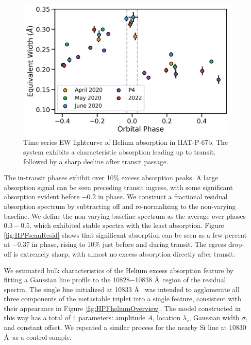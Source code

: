 \documentclass[twocolumn]{aastex631}
\begin{document}
\begin{figure}
    \includegraphics[width=\linewidth]{figures/HAT_P_67b_Helium10830EW_byCampaign.png}
    \caption{Time series EW lightcurve of Helium absorption in HAT-P-67b.  The system exhibits a characteristic absorption leading up to transit, followed by a sharp decline after transit passage.  }
    \label{fig:HPFtimeseries}
\end{figure}


The in-transit phases exhibit over 10\% excess absorption peaks.  A large absorption signal can be seen preceding transit ingress, with some significant absorption evident before $-0.2$ in phase.  We construct a fractional residual absorption spectrum by subtracting off and re-normalizing to the non-varying baseline.  We define the non-varying baseline spectrum as the average over phases $0.3-0.5$, which exhibited stable spectra with the least absorption.  Figure \ref{fig:HPFscanResid} shows that significant absorption can be seen as a few percent at $-0.37$ in phase, rising to 10\% just before and during transit.  The egress drop-off is extremely sharp, with almost no excess absorption directly after transit.


We estimated bulk characteristics of the Helium excess absorption feature by fitting a Gaussian line profile to the 10828$-$10838 \AA~region of the residual spectra.  The single line initialized at 10833 \AA~ was intended to agglomerate all three components of the metastable triplet into a single feature, consistent with their appearance in Figure \ref{fig:HPFheliumOverview}.  The model constructed in this way has a total of 4 parameters: amplitude $A$, location $\lambda_c$, Gaussian width $\sigma$, and constant offset.  We repeated a similar process for the nearby Si line at 10830 \AA~as a control sample.
\end{document}
